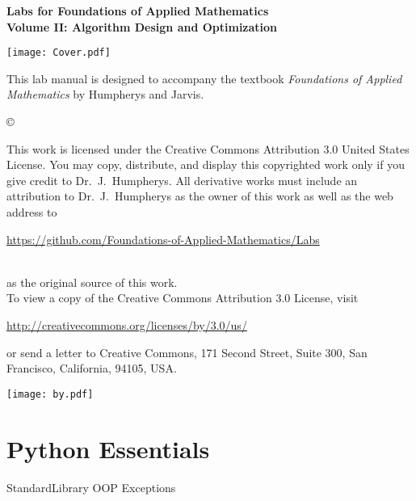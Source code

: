 \documentclass[nociteref]{SIAM-GH-book}
\begin{document}

\thispagestyle{empty} %

\begin{center}
{\huge \bf Labs for Foundations of Applied Mathematics} \\
\vspace{5mm}
{\Large \bf Volume II: Algorithm Design and Optimization}
\vspace{20mm}

\texttt{[image: Cover.pdf]}
\end{center}
\frontmatter



\begin{thepreface} %

This lab manual is designed to accompany the textbook \emph{Foundations of Applied Mathematics} by Humpherys and Jarvis.

\vfill
\copyright{This work is licensed under the Creative Commons Attribution 3.0 United States
License.  You may copy, distribute, and display this copyrighted work only if you give
credit to Dr.~J.~Humpherys. All derivative works must include an attribution to Dr.~J.~Humpherys as the owner of this work as well as the web address to
\\\centerline{\url{https://github.com/Foundations-of-Applied-Mathematics/Labs}}\\as the original source of this work.
\\To view a copy of the Creative Commons Attribution 3.0 License, visit
\\\centerline{\url{http://creativecommons.org/licenses/by/3.0/us/}} or send a letter to Creative Commons, 171 Second Street, Suite 300, San Francisco, California, 94105, USA.}

\vfill
\centering\texttt{[image: by.pdf]}
\vfill
\end{thepreface}

\setcounter{tocdepth}{1}
\tableofcontents

\mainmatter %

\part{Python Essentials} %
{StandardLibrary}
{OOP}
{Exceptions}
\end{document}
